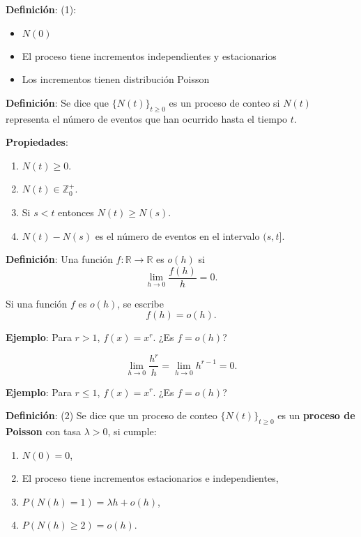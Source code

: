 \documentclass[12pt,a4paper]{article}
\newcommand{\definicion}[1]{%
\begin{definicionbox}
\textbf{Definición}: #1
\end{definicionbox}
}
\begin{document}
\definicion{(1):
\begin{itemize}
    \item $N(0)$
    \item El proceso tiene incrementos independientes y estacionarios
    \item Los incrementos tienen distribución Poisson
\end{itemize}}

\definicion{Se dice que $\{N(t)\}_{t \geq 0}$ es un proceso de conteo si $N(t)$ representa el número de eventos que han ocurrido hasta el tiempo $t$.}

\textbf{Propiedades}:

\begin{enumerate}
    \item $N(t) \geq 0$.
    \item $N(t) \in \mathbb{Z}_{0}^{+}$.
    \item Si $s < t$ entonces $N(t) \geq N(s)$.
    \item $N(t) - N(s)$ es el número de eventos en el intervalo $(s,t]$.
\end{enumerate}

\definicion{Una función $f : \mathbb{R} \to \mathbb{R}$ es $o(h)$ si 
\begin{equation*}
\lim_{h \to 0} \frac{f(h)}{h} = 0.
\end{equation*}}

Si una función $f$ es $o(h)$, se escribe
\begin{equation*}
f(h) = o(h).
\end{equation*}

\textbf{Ejemplo}: Para $r > 1$, $f(x) = x^r$. ¿Es $f = o(h)$?

\begin{equation*}
\lim_{h \to 0} \frac{h^r}{h} = \lim_{h \to 0} h^{r-1} = 0.
\end{equation*}

\begin{center}
\end{center}

\textbf{Ejemplo}: Para $r \leq 1$, $f(x) = x^r$. ¿Es $f = o(h)$?

\definicion{(2) Se dice que un proceso de conteo $\{N(t)\}_{t \geq 0}$ es un \textbf{proceso de Poisson} con tasa $\lambda > 0$, si cumple:
\begin{enumerate}
    \item $N(0) = 0$,
    \item El proceso tiene incrementos estacionarios e independientes,
    \item $P(N(h) = 1) = \lambda h + o(h)$,
    \item $P(N(h) \geq 2) = o(h)$.
\end{enumerate}}
\end{document}
